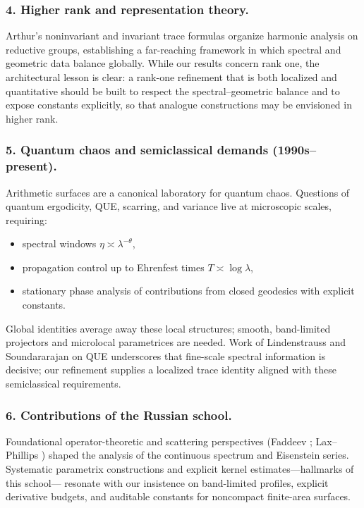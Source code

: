 \medskip

\subsubsection*{4. Higher rank and representation theory.}
Arthur’s noninvariant and invariant trace formulas \cite{ArthurBook} organize harmonic analysis on reductive groups,
establishing a far-reaching framework in which spectral and geometric data balance globally.
While our results concern rank one, the architectural lesson is clear:
a rank-one refinement that is both localized and quantitative should be built
to respect the spectral–geometric balance and to expose constants explicitly,
so that analogue constructions may be envisioned in higher rank.

\medskip

\subsubsection*{5. Quantum chaos and semiclassical demands (1990s–present).}
Arithmetic surfaces are a canonical laboratory for quantum chaos.
Questions of quantum ergodicity, QUE, scarring, and variance live at microscopic scales, requiring:
\begin{itemize}
  \item spectral windows $\eta\asymp\lambda^{-\theta}$,
  \item propagation control up to Ehrenfest times $T\asymp\log\lambda$,
  \item stationary phase analysis of contributions from closed geodesics with explicit constants.
\end{itemize}
Global identities average away these local structures; smooth, band-limited projectors and microlocal parametrices are needed.
Work of Lindenstrauss and Soundararajan on QUE \cite{LindenstraussQUE,SoundararajanQUE} underscores that fine-scale spectral
information is decisive; our refinement supplies a localized trace identity aligned with these semiclassical requirements.

\medskip

\subsubsection*{6. Contributions of the Russian school.}
Foundational operator-theoretic and scattering perspectives (Faddeev \cite{Faddeev1967}; Lax–Phillips \cite{LaxPhillips1976})
shaped the analysis of the continuous spectrum and Eisenstein series.
Systematic parametrix constructions and explicit kernel estimates—hallmarks of this school—
resonate with our insistence on band-limited profiles, explicit derivative budgets, and auditable constants for noncompact finite-area surfaces.


